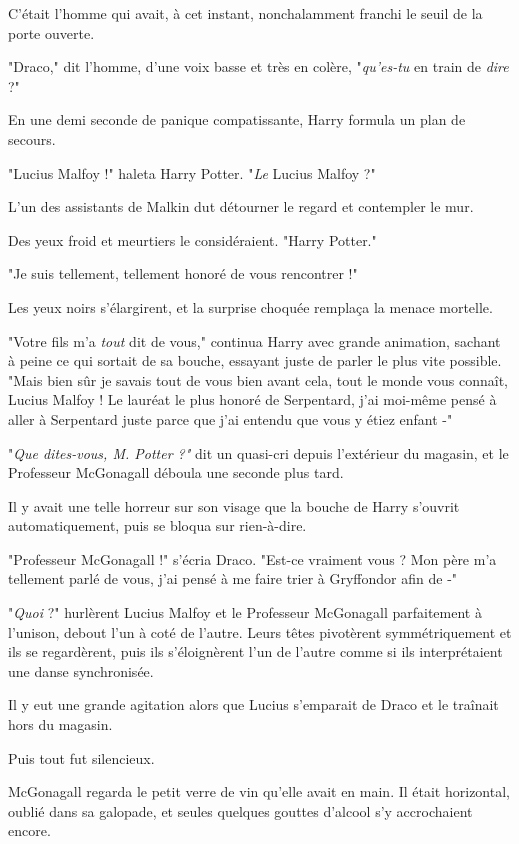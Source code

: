 C'était l'homme qui avait, à cet instant, nonchalamment franchi le seuil de la porte ouverte.

"Draco," dit l'homme, d'une voix basse et très en colère, "\emph{qu'es-tu}  en train de \emph{dire}  ?"

En une demi seconde de panique compatissante, Harry formula un plan de secours.

"Lucius Malfoy !" haleta Harry Potter. "\emph{Le}  Lucius Malfoy ?"

L'un des assistants de Malkin dut détourner le regard et contempler le mur.

Des yeux froid et meurtiers le considéraient. "Harry Potter."

"Je suis tellement, tellement honoré de vous rencontrer !"

Les yeux noirs s'élargirent, et la surprise choquée remplaça la menace mortelle.

"Votre fils m'a \emph{tout}  dit de vous," continua Harry avec grande animation, sachant à peine ce qui sortait de sa bouche, essayant juste de parler le plus vite possible. "Mais bien sûr je savais tout de vous bien avant cela, tout le monde vous connaît, Lucius Malfoy ! Le lauréat le plus honoré de Serpentard, j'ai moi-même pensé à aller à Serpentard juste parce que j'ai entendu que vous y étiez enfant -"

"\emph{Que dites-vous, M. Potter ?" } dit un quasi-cri depuis l'extérieur du magasin, et le Professeur McGonagall déboula une seconde plus tard.

Il y avait une telle horreur sur son visage que la bouche de Harry s'ouvrit automatiquement, puis se bloqua sur rien-à-dire.

"Professeur McGonagall !" s'écria Draco. "Est-ce vraiment vous ? Mon père m'a tellement parlé de vous, j'ai pensé à me faire trier à Gryffondor afin de -"

"\emph{Quoi } ?" hurlèrent Lucius Malfoy et le Professeur McGonagall parfaitement à l'unison, debout l'un à coté de l'autre. Leurs têtes pivotèrent symmétriquement et ils se regardèrent, puis ils s'éloignèrent l'un de l'autre comme si ils interprétaient une danse synchronisée.

Il y eut une grande agitation alors que Lucius s'emparait de Draco et le traînait hors du magasin.

Puis tout fut silencieux.

McGonagall regarda le petit verre de vin qu'elle avait en main. Il était horizontal, oublié dans sa galopade, et seules quelques gouttes d'alcool s'y accrochaient encore.

